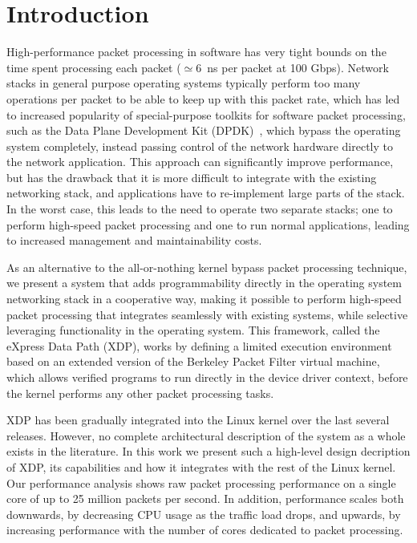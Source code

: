 \documentclass[10pt,sigconf]{acmart}
\begin{document}
\section{Introduction}%
\label{sec:introduction}
High-performance packet processing in software has very tight bounds on the time
spent processing each packet ($\simeq6$~ns per packet at 100 Gbps). Network
stacks in general purpose operating systems typically perform too many
operations per packet to be able to keep up with this packet rate, which has led
to increased popularity of special-purpose toolkits for software packet
processing, such as the Data Plane Development Kit (DPDK)~\cite{dpdk}, which
bypass the operating system completely, instead passing control of the network
hardware directly to the network application. This approach can significantly
improve performance, but has the drawback that it is more difficult to integrate
with the existing networking stack, and applications have to re-implement large
parts of the stack. In the worst case, this leads to the need to operate two
separate stacks; one to perform high-speed packet processing and one to run
normal applications, leading to increased management and maintainability costs.

As an alternative to the all-or-nothing kernel bypass packet processing
technique, we present a system that adds programmability directly in the
operating system networking stack in a cooperative way, making it possible to
perform high-speed packet processing that integrates seamlessly with existing
systems, while selective leveraging functionality in the operating system. This
framework, called the eXpress Data Path (XDP), works by defining a limited
execution environment based on an extended version of the Berkeley Packet Filter
virtual machine, which allows verified programs to run directly in the device
driver context, before the kernel performs any other packet processing tasks.

XDP has been gradually integrated into the Linux kernel over the last several
releases. However, no complete architectural description of the system as a
whole exists in the literature. In this work we present such a high-level design
decription of XDP, its capabilities and how it integrates with the rest of the
Linux kernel. Our performance analysis shows raw packet processing performance
on a single core of up to 25 million packets per second. In addition,
performance scales both downwards, by decreasing CPU usage as the traffic load
drops, and upwards, by increasing performance with the number of cores dedicated
to packet processing.
\end{document}
